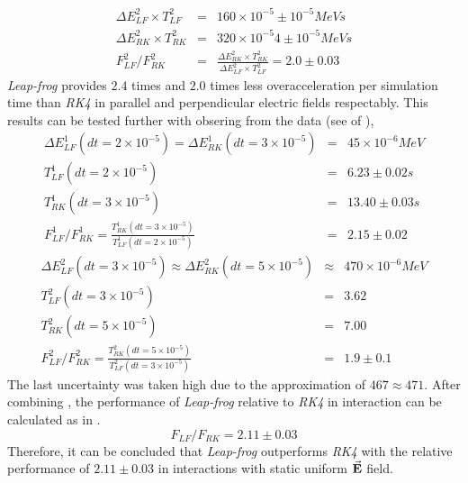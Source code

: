 \documentclass{book}
\begin{document}
\begin{eqnarray} \label{eq:f_lf_rk_2}
    \Delta E_{LF}^2 \times T_{LF}^2 &=& 160 \times 10^{-5} \pm 10^{-5} MeV s \nonumber\\ %
    \Delta E_{RK}^2 \times T_{RK}^2 &=& 320 \times 10^{-5} 4 \pm 10^{-5} MeV s \nonumber\\ %
    F_{LF}^2/F_{RK}^2 &=& \frac{\Delta E_{RK}^2 \times T_{RK}^2 }{\Delta E_{LF}^2 \times T_{LF}^2} = 2.0  \pm 0.03
\end{eqnarray}
\textit{Leap-frog} provides $2.4$ times and $2.0$ times less overacceleration per simulation time than \textit{RK4} in parallel and perpendicular electric fields respectably.
This results can be tested further with obsering from the data (see  of ),
\begin{eqnarray} \label{eq:f_lf_rk_3}
    \Delta E_{LF}^1 (dt=2 \times 10^{-5}) = \Delta E_{RK}^1 (dt=3 \times 10^{-5}) &=& 45 \times 10^{-6} MeV \nonumber\\
    T_{LF}^1(dt=2 \times 10^{-5})  &=& 6.23 \pm 0.02 s \nonumber\\ %
    T_{RK}^1(dt=3 \times 10^{-5})  &=& 13.40 \pm 0.03 s \nonumber\\ %
    F_{LF}^1/F_{RK}^1 = \frac{T_{RK}^1(dt=3 \times 10^{-5})}{T_{LF}^1(dt=2 \times 10^{-5})} &=& 2.15 \pm 0.02
\end{eqnarray}
\begin{eqnarray} \label{eq:f_lf_rk_4}
    \Delta E_{LF}^2 (dt=3 \times 10^{-5}) \approx \Delta E_{RK}^2 (dt=5 \times 10^{-5}) &\approx& 470 \times 10^{-6} MeV \nonumber\\
    T_{LF}^2(dt=3 \times 10^{-5})  &=& 3.62 \nonumber\\ %
    T_{RK}^2(dt=5 \times 10^{-5})  &=& 7.00 \nonumber\\ %
    F_{LF}^2/F_{RK}^2 = \frac{T_{RK}^2(dt=5 \times 10^{-5})}{T_{LF}^2(dt=3 \times 10^{-5})} &=& 1.9 \pm 0.1
\end{eqnarray}
The last uncertainty was taken high due to the approximation of $467 \approx 471$. After combining ,
the performance of \textit{Leap-frog} relative to \textit{RK4} in \eE interaction can be calculated as in .
\begin{equation}\label{eq:lf_rk_eE_relative_performance}
    F_{LF}/F_{RK} = 2.11 \pm 0.03
\end{equation}
Therefore, it can be concluded that \textit{Leap-frog} outperforms \textit{RK4} with the relative performance of $2.11 \pm 0.03$ in \eE interactions with static uniform $\vec{\textbf{E}}$ field. 
\end{document}
